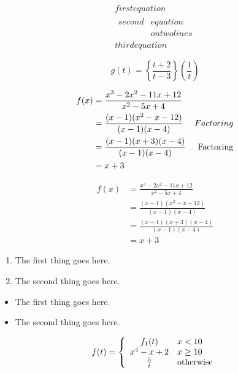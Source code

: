 \documentclass{article}
\begin{document}
\begin{gather}
  first equation\\
  \begin{split}
  second & equation\\
  & on two lines
  \end{split}
  \\
  third equation
  \end{gather}

\begin{equation}
  g(t) = \left\{\frac{t+2}{t-3}\right\}\left(\frac{1}{t}\right)
  \end{equation}



\begin{equation}
  \begin{aligned}
    f(x) &= \frac{x^3-2x^2-11x+12}{x^2-5x+4} & {}\\
    &= \frac{(x-1)(x^2-x-12)}{(x-1)(x-4)} & {Factoring}\\
    &= \frac{(x-1)(x+3)(x-4)}{(x-1)(x-4)} & {\rm Factoring} \\
    &= x+3 &{}
  \end{aligned}
  \end{equation}    

  \begin{equation}
    \begin{aligned}
      f(x) &= \frac{x^3-2x^2-11x+12}{x^2-5x+4} \\
      &= \frac{(x-1)(x^2-x-12)}{(x-1)(x-4)} \\
      &= \frac{(x-1)(x+3)(x-4)}{(x-1)(x-4)} \\
      &= x+3
      \end{aligned}
  \end{equation}
  


\begin{enumerate}
  \item The first thing goes here.
  \item The second thing goes here.
  \end{enumerate}


\begin{itemize}
  \item The first thing goes here.
  \item The second thing goes here.
  \end{itemize}


\begin{equation}
  f(t) = 
  \left\{
    \begin{array}{cl}
      f_1(t) & x < 10\\
      x^4-x +2 & x \geq 10\\
      \frac{5}{t} & {\rm otherwise}
    \end{array}
  \right.
  \end{equation}
\end{document}
